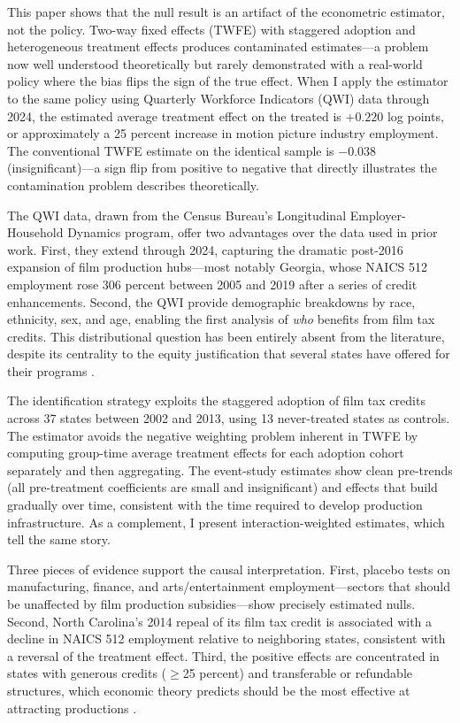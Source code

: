 \documentclass[12pt]{article}
\begin{document}
This paper shows that the null result is an artifact of the econometric estimator, not the policy. Two-way fixed effects (TWFE) with staggered adoption and heterogeneous treatment effects produces contaminated estimates---a problem now well understood theoretically \citep{goodman2021difference, de2020two, sun2021estimating} but rarely demonstrated with a real-world policy where the bias flips the sign of the true effect. When I apply the \citet{callaway2021difference} estimator to the same policy using Quarterly Workforce Indicators (QWI) data through 2024, the estimated average treatment effect on the treated is $+0.220$ log points, or approximately a 25 percent increase in motion picture industry employment. The conventional TWFE estimate on the identical sample is $-0.038$ (insignificant)---a sign flip from positive to negative that directly illustrates the contamination problem \citet{goodman2021difference} describes theoretically.

The QWI data, drawn from the Census Bureau's Longitudinal Employer-Household Dynamics program, offer two advantages over the data used in prior work. First, they extend through 2024, capturing the dramatic post-2016 expansion of film production hubs---most notably Georgia, whose NAICS 512 employment rose 306 percent between 2005 and 2019 after a series of credit enhancements. Second, the QWI provide demographic breakdowns by race, ethnicity, sex, and age, enabling the first analysis of \emph{who} benefits from film tax credits. This distributional question has been entirely absent from the literature, despite its centrality to the equity justification that several states have offered for their programs \citep{christopherson2008project}.

The identification strategy exploits the staggered adoption of film tax credits across 37 states between 2002 and 2013, using 13 never-treated states as controls. The \citet{callaway2021difference} estimator avoids the negative weighting problem inherent in TWFE by computing group-time average treatment effects for each adoption cohort separately and then aggregating. The event-study estimates show clean pre-trends (all pre-treatment coefficients are small and insignificant) and effects that build gradually over time, consistent with the time required to develop production infrastructure. As a complement, I present \citet{sun2021estimating} interaction-weighted estimates, which tell the same story.

Three pieces of evidence support the causal interpretation. First, placebo tests on manufacturing, finance, and arts/entertainment employment---sectors that should be unaffected by film production subsidies---show precisely estimated nulls. Second, North Carolina's 2014 repeal of its film tax credit is associated with a decline in NAICS 512 employment relative to neighboring states, consistent with a reversal of the treatment effect. Third, the positive effects are concentrated in states with generous credits ($\geq$25 percent) and transferable or refundable structures, which economic theory predicts should be the most effective at attracting productions \citep{thom2018green}.
\end{document}
